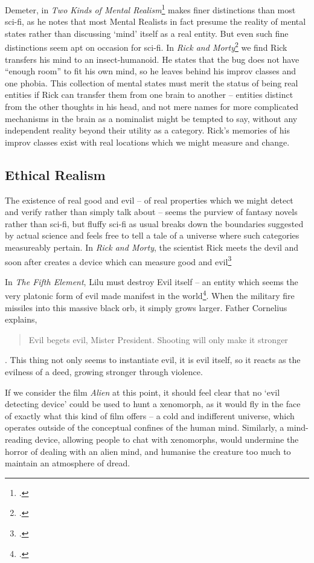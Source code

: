 \documentclass{article}
\begin{document}
Demeter, in \textit{Two Kinds of Mental Realism}\footcite[p 59-60]{twokindsmentalrealism} makes finer distinctions than most sci-fi, as he notes that most Mental Realists in fact presume the reality of mental states rather than discussing `mind' itself as a real entity. But even such fine distinctions seem apt on occasion for sci-fi. In \textit{Rick and Morty}\footcite[\textit{Rickshank Rickdemption}, s. 3, e. 1]{ricknmorty} we find Rick transfers his mind to an insect-humanoid. He states that the bug does not have ``enough room'' to fit his own mind, so he leaves behind his improv classes and one phobia. This collection of mental states must merit the status of being real entities if Rick can transfer them from one brain to another -- entities distinct from the other thoughts in his head, and not mere names for more complicated mechanisms in the brain as a nominalist might be tempted to say, without any independent reality beyond their utility as a category. Rick's memories of his improv classes exist with real locations which we might measure and change.

\subsection{Ethical Realism}
The existence of real good and evil -- of real properties which we might detect and verify rather than simply talk about -- seems the purview of fantasy novels rather than sci-fi, but fluffy sci-fi as usual breaks down the boundaries suggested by actual science and feels free to tell a tale of a universe where such categories measureably pertain. In \textit{Rick and Morty}, the scientist Rick meets the devil and soon after creates a device which can measure good and evil\footcite[\textit{Something Ricked This Way Comes}, s. 1, e. 9]{ricknmorty}

In \textit{The Fifth Element}, Lilu must destroy Evil itself -- an entity which seems the very platonic form of evil made manifest in the world\footcite{fifthelement}. When the military fire missiles into this massive black orb, it simply grows larger. Father Cornelius explains, \begin{quote}Evil begets evil, Mister President. Shooting will only make it stronger\end{quote}. This thing not only seems to instantiate evil, it is evil itself, so it reacts as the evilness of a deed, growing stronger through violence.

If we consider the film \textit{Alien} at this point, it should feel clear that no `evil detecting device' could be used to hunt a xenomorph, as it would fly in the face of exactly what this kind of film offers -- a cold and indifferent universe, which operates outside of the conceptual confines of the human mind. Similarly, a mind-reading device, allowing people to chat with xenomorphs, would undermine the horror of dealing with an alien mind, and humanise the creature too much to maintain an atmosphere of dread.
\end{document}
